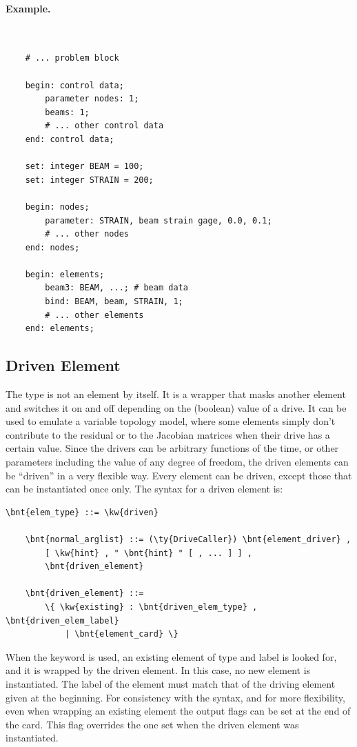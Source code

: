 \paragraph{Example.} \
\begin{verbatim}
    # ... problem block

    begin: control data;
        parameter nodes: 1;
        beams: 1;
        # ... other control data
    end: control data;

    set: integer BEAM = 100;
    set: integer STRAIN = 200;

    begin: nodes;
        parameter: STRAIN, beam strain gage, 0.0, 0.1;
        # ... other nodes
    end: nodes;

    begin: elements;
        beam3: BEAM, ...; # beam data
        bind: BEAM, beam, STRAIN, 1;
        # ... other elements
    end: elements;
\end{verbatim}



\subsection{Driven Element}\label{sec:EL:BASE:DRIVEN}
The  type is not an element by itself. It is a wrapper that
masks another element and switches it on and off depending on the (boolean)
value of a drive. It can be used to emulate a variable topology model,
where some elements simply don't contribute to the residual
or to the Jacobian matrices when their drive has a certain value.
Since the drivers can be arbitrary functions of the time, 
or other parameters including the value of any degree of freedom, 
the driven elements can be ``driven'' in a very flexible way.
Every element can be driven, except those that can be instantiated once only.
The syntax for a driven element is:
\begin{Verbatim}[commandchars=\\\{\}]
    \bnt{elem_type} ::= \kw{driven}

    \bnt{normal_arglist} ::= (\ty{DriveCaller}) \bnt{element_driver} ,
        [ \kw{hint} , " \bnt{hint} " [ , ... ] ] ,
        \bnt{driven_element}

    \bnt{driven_element} ::=
        \{ \kw{existing} : \bnt{driven_elem_type} , \bnt{driven_elem_label}
            | \bnt{element_card} \}
\end{Verbatim}
When the keyword  is used, an existing element 
of type  and label  is looked for, 
and it is wrapped by the driven element.
In this case, no new element is instantiated.
The label of the element must match that of the driving element given 
at the beginning.
For consistency with the syntax, and for more flexibility, 
even when wrapping an existing element the output flags can be set
at the end of the card.
This flag overrides the one set when the driven element was instantiated.

